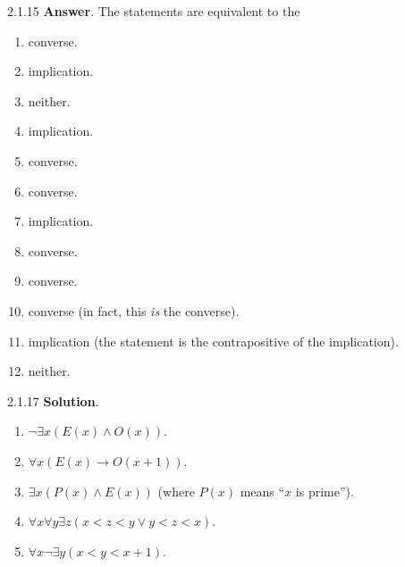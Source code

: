 \documentclass[11pt,]{book}
\theoremstyle{ptxplainnotitle}
\theoremstyle{ptxplaintitle}
\theoremstyle{ptxdefinitionnotitle}
\theoremstyle{ptxdefinitiontitle}
\theoremstyle{ptxdefinitionnotitle}
\theoremstyle{ptxdefinitiontitle}
\theoremstyle{ptxdefinitionnotitle}
\theoremstyle{ptxdefinitiontitle}
\theoremstyle{ptxdefinitiontitlenonumber}
\theoremstyle{ptxdefinitiontitlenonumber}
\numberwithin{equation}{chapter}
\newcommand{\imp}{\rightarrow}
\newcommand{\lt}{<}
\begin{document}
\begin{divisionexercise}{2.1.15}
\textbf{Answer}.\quad%
\hypertarget{p-2313}{}%
The statements are equivalent to the\textellipsis{} \leavevmode%
\begin{enumerate}[label=(\alph*)]
\item\hypertarget{li-1195}{}\hypertarget{p-2314}{}%
converse.%
\item\hypertarget{li-1196}{}\hypertarget{p-2315}{}%
implication.%
\item\hypertarget{li-1197}{}\hypertarget{p-2316}{}%
neither.%
\item\hypertarget{li-1198}{}\hypertarget{p-2317}{}%
implication.%
\item\hypertarget{li-1199}{}\hypertarget{p-2318}{}%
converse.%
\item\hypertarget{li-1200}{}\hypertarget{p-2319}{}%
converse.%
\item\hypertarget{li-1201}{}\hypertarget{p-2320}{}%
implication.%
\item\hypertarget{li-1202}{}\hypertarget{p-2321}{}%
converse.%
\item\hypertarget{li-1203}{}\hypertarget{p-2322}{}%
converse.%
\item\hypertarget{li-1204}{}\hypertarget{p-2323}{}%
converse (in fact, this \emph{is} the converse).%
\item\hypertarget{li-1205}{}\hypertarget{p-2324}{}%
implication (the statement is the contrapositive of the implication).%
\item\hypertarget{li-1206}{}\hypertarget{p-2325}{}%
neither.%
\end{enumerate}
%
\end{divisionexercise}%
\begin{divisionexercise}{2.1.17}
\textbf{Solution}.\quad%
\hypertarget{p-2334}{}%
\leavevmode%
\begin{enumerate}[label=(\alph*)]
\item\hypertarget{li-1212}{}\(\neg \exists x (E(x) \wedge O(x))\).%
\item\hypertarget{li-1213}{}\(\forall x (E(x) \imp O(x+1))\).%
\item\hypertarget{li-1214}{}\(\exists x(P(x) \wedge E(x))\) (where \(P(x)\) means ``\(x\) is prime'').%
\item\hypertarget{li-1215}{}\(\forall x \forall y \exists z(x \lt  z \lt  y \vee y \lt  z \lt  x)\).%
\item\hypertarget{li-1216}{}\(\forall x \neg \exists y (x \lt  y \lt  x+1)\).%
\end{enumerate}
%
\end{divisionexercise}%
\end{document}
